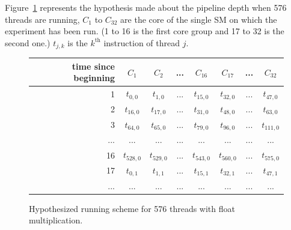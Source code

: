 \documentclass{report}
\begin{document}
    Figure~\ref{fig:fp_prediction_512}
    represents the hypothesis made about the pipeline depth when 576 threads are running, $C_1$ to
    $C_{32}$ are the core of the single SM on which the experiment has been run. (1 to 16 is the
    first core group and 17 to 32 is the second one.) $t_{j,k}$ is the $k^{\text{th}}$ instruction of thread $j$. 
        \begin{figure}[H]
      \centering
       \begin{tabular}{ | r || c | c | c | c || c | c | c | }
    	    \hline
    	    time since beginning & $C_1$ & $C_2$ & ... & $C_{16}$ & $C_{17}$ & ... & $C_{32}$ \\ \hline  \hline
    	   1 & $t_{0,0}$ & $t_{1,0}$ & ... & $t_{15,0}$ & $t_{32, 0}$ & ... & $t_{47, 0}$ \\ \hline 
    	   2 & $t_{16,0}$ & $t_{17,0}$ & ... & $t_{31,0}$ & $t_{48, 0}$ & ... & $t_{63, 0}$ \\ \hline
    	   3 & $t_{64,0}$ & $t_{65,0}$ & ... & $t_{79,0}$ & $t_{96, 0}$ & ... & $t_{111, 0}$ \\ \hline
    	   ... & ... & ... & ... & ... & ... & ... & ... \\ \hline
    	   16 & $t_{528,0}$ & $t_{529,0}$ & ... & $t_{543,0}$ & $t_{560,0}$ & ... & $t_{575, 0}$ \\ \hline
    	   17 & $t_{0,1}$ & $t_{1,1}$ & ... & $t_{15,1}$ & $t_{32, 1}$ & ... & $t_{47, 1}$ \\ \hline
    	   ... & ... & ... & ... & ... & ... & ... & ... \\ \hline
  	\end{tabular}
  	\captionsetup{justification=centering}
  	\caption{Hypothesized running scheme for 576 threads with float multiplication.}
  	\label{fig:fp_prediction_512}
   \end{figure}
   
\end{document}
